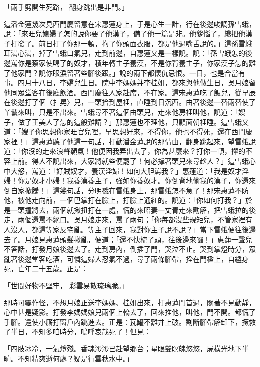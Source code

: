 \begin{showcontents}{}
「兩手劈開生死路，  翻身跳出是非門。」

這潘金蓮幾次見西門慶留意在宋惠蓮身上，于是心生一計，行在後邊唆調孫雪蛾，說：「來旺兒媳婦子怎的說你要了他漢子，備了他一篇是非。他爹惱了，纔把他漢子打發了。前日打了你那一頓，拘了你頭面衣服，都是他過嘴舌說的。」這孫雪蛾耳滿心滿，掉了雪蛾口氣兒，走到前邊，自惠蓮又是一樣說。說：「孫雪蛾怎的後邊罵你是蔡家使喝了的奴才，積年轉主子養漢，不是你背養主子，你家漢子怎的離了他家門？說你眼淚留著些腳後跟。」說的兩下都懷仇忌恨。一日，也是合當有事。四月十八日，李嬌兒生日。院中李媽媽并李桂姐，都來與他做生日，吳月娘留他同眾堂客在後廳飲酒。西門慶往人家赴席，不在家。這宋惠蓮吃了飯兒，從早辰在後邊打了個〈扌晃〉兒，一頭拾到屋裡，直睡到日沉西。由著後邊一替兩替使了丫鬟來叫，只是不出來。雪蛾尋不著這個由頭兒，走來他房裡叫他，說道：「嫂子，做了王美人了怎的這般難請？」那惠蓮也不理他，只顧面朝裡睡。這雪蛾又道：「嫂子你思想你家旺官兒哩，早思想好來，不得你，他也不得死，還在西門慶家裡！」這惠蓮聽了他這一句話，打動潘金蓮說的那情由，翻身跳起來，望雪蛾說道：「你沒的走來浪聲顙氣！他便因我弄出去了，你為甚麼來？打你一頓，攆的不容上前。得人不說出來，大家將就些便罷了！何必撑著頭兒來尋趁人？」這雪蛾心中大怒，罵道：「好賊奴才，養漢淫婦！如何大胆罵我？」惠蓮道：「我是奴才淫婦！你是奴才小婦！我養漢養主子，強如你養奴才。你倒背地偷我的漢子，你還來倒自家掀騰！」這幾句話，分明戮在雪蛾身上，那雪蛾怎不急了！那宋惠蓮不防他，被他走向前，一個巴掌打在臉上，打臉上通紅的。說道：「你如何打我？」於是一頭撞將去，兩個就揪扭打在一處，慌的來昭妻一丈青走來勸解，把雪蛾拉的後走，兩個還罵不絕口。吳月娘走來，罵了兩句；「你每都沒些規矩兒，不管家裡有人沒人，都這等家反宅亂。等主子回來，我對你主子說不說？」當下雪蛾便往後邊去了。月娘見惠蓮頭髮揪亂，便道；「還不快梳了頭，往後邊來囉！」惠蓮一聲兒不答話，打發月娘後邊去了。走到房內，倒插了門，哭泣不止。哭到掌燈時分，眾亂著後邊堂客吃酒，可憐這婦人忍氣不過，尋了兩條腳帶，拴在門楹上，自縊身死，亡年二十五歲。正是：

「世間好物不堅牢，  彩雲易散琉璃脆。」

那時可霎作怪，不想月娘正送李媽媽、桂姐出來，打惠蓮門首過，關著不見動靜，心中甚是疑影。打發李媽媽娘兒兩個上轎去了，回來推他，叫他，門不開。都慌了手腳。還使小廝打窗戶內跳進去。正是：瓦罐不離井上破。割斷腳帶解卸下，撅救了半日，不知多咱時分，鳴呼哀哉死了！但見：

「四肢冰冷，一氣燈殘。香魂渺渺已赴望鄉台；星眼雙瞑魄悠悠，屍橫光地下半晌。不知精爽逝何處？疑是行雲秋水中。」


\end{showcontents}
